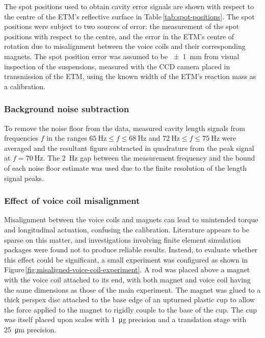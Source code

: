 The spot positions used to obtain cavity error signals are shown with respect to the centre of the \gls{ETM}'s reflective surface in Table\,\ref{tab:spot-positions}. The spot positions were subject to two sources of error: the measurement of the spot positions with respect to the centre, and the error in the \gls{ETM}'s centre of rotation due to misalignment between the voice coils and their corresponding magnets. The spot position error was assumed to be \SI{\pm1}{\milli\meter} from visual inspection of the suspensions, measured with the CCD camera placed in transmission of the \gls{ETM}, using the known width of the \gls{ETM}'s reaction mass as a calibration.

\subsubsection{Background noise subtraction}
To remove the noise floor from the data, measured cavity length signals from frequencies $f$ in the ranges $\SI{65}{\hertz} \le f \le \SI{68}{\hertz}$ and $\SI{72}{\hertz} \le f \le \SI{75}{\hertz}$ were averaged and the resultant figure subtracted in quadrature from the peak signal at $f = \SI{70}{\hertz}$. The \SI{2}{\hertz} gap between the measurement frequency and the bound of each noise floor estimate was used due to the finite resolution of the length signal peaks.

\subsubsection{Effect of voice coil misalignment}
Misalignment between the voice coils and magnets can lead to unintended torque and longitudinal actuation, confusing the calibration. Literature appears to be sparse on this matter, and investigations involving finite element simulation packages were found not to produce reliable results. Instead, to evaluate whether this effect could be significant, a small experiment was configured as shown in Figure\,\ref{fig:misaligned-voice-coil-experiment}. A rod was placed above a magnet with the voice coil attached to its end, with both magnet and voice coil having the same dimensions as those of the main experiment. The magnet was glued to a thick perspex disc attached to the base edge of an upturned plastic cup to allow the force applied to the magnet to rigidly couple to the base of the cup. The cup was itself placed upon scales with \SI{1}{\micro\gram} precision and a translation stage with \SI{25}{\micro\meter} precision.

